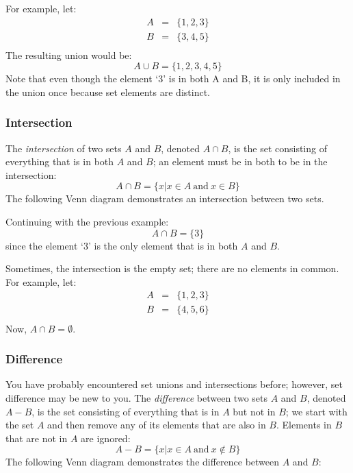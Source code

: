 \documentclass[letterpaper,12pt,fleqn]{article}
\begin{document}
For example, let:
\begin{eqnarray*}
A &=& \{1, 2, 3\} \\
B &=& \{3, 4, 5\} \\
\end{eqnarray*}
The resulting union would be:
\[A\cup B=\{1, 2, 3, 4, 5\}\]
Note that even though the element `3' is in both A and B, it is only included
in the union once because set elements are distinct.

\subsubsection*{Intersection}

The \emph{intersection} of two sets $A$ and $B$, denoted $A\cap B$, is the set
consisting of everything that is in both $A$ and $B$; an element must be in both
to be in the intersection:
\[A\cap B=\{x|x\in A\ \mbox{and}\ x\in B\}\]
The following Venn diagram demonstrates an intersection between two sets.

\begin{center}
\end{center}

Continuing with the previous example:
\[A\cap B=\{3\}\]
since the element `3' is the only element that is in both $A$ and $B$.

Sometimes, the intersection is the empty set; there are no elements in common.
For example, let:
\begin{eqnarray*}
A &=& \{1, 2, 3\} \\
B &=& \{4, 5, 6\} \\
\end{eqnarray*}
Now, $A\cap B=\emptyset$.

\subsubsection*{Difference}

You have probably encountered set unions and intersections before; however, set
difference may be new to you. The \emph{difference} between two sets $A$ and
$B$, denoted $A-B$, is the set consisting of everything that is in $A$ but not
in $B$; we start with the set $A$ and then remove any of its elements that are
also in $B$. Elements in $B$ that are not in $A$ are ignored:
\[A-B=\{x|x\in A\ \mbox{and}\ x\notin B\}\]
The following Venn diagram demonstrates the difference between $A$ and $B$:
\end{document}
